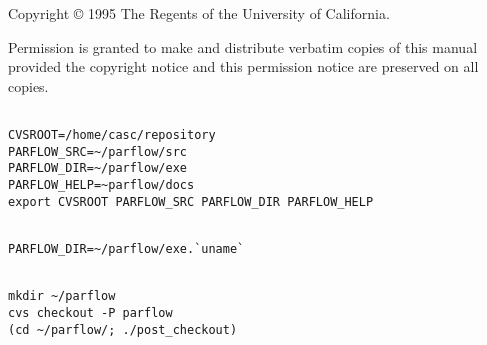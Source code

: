 
{\newpage\clearpage
{}%
\begin{TitlePage}
\par
{}
\SubTitle{\today}
\par
\end{TitlePage}%
\lthtmlfigureZ
\lthtmlcheckvsize\clearpage}

{\newpage\clearpage
{}%
\begin{CopyrightPage}
\par
\noindent
Copyright \copyright{} 1995 The Regents of the University of California.
\par
\vspace{1em}\noindent
Permission is granted to make and distribute verbatim copies of this
manual provided the copyright notice and this permission notice are
preserved on all copies.
\par
\end{CopyrightPage}%
\lthtmlfigureZ
\lthtmlcheckvsize\clearpage}

{\newpage\clearpage
{}%
\begin{display}\begin{verbatim}

CVSROOT=/home/casc/repository
PARFLOW_SRC=~/parflow/src
PARFLOW_DIR=~/parflow/exe
PARFLOW_HELP=~parflow/docs
export CVSROOT PARFLOW_SRC PARFLOW_DIR PARFLOW_HELP\end{verbatim}
\end{display}%
\lthtmlfigureZ
\lthtmlcheckvsize\clearpage}

{\newpage\clearpage
{}%
\begin{display}\begin{verbatim}

PARFLOW_DIR=~/parflow/exe.`uname`\end{verbatim}
\end{display}%
\lthtmlfigureZ
\lthtmlcheckvsize\clearpage}

{\newpage\clearpage
{}%
\begin{display}\begin{verbatim}

mkdir ~/parflow
cvs checkout -P parflow
(cd ~/parflow/; ./post_checkout)\end{verbatim}
\end{display}%
\lthtmlfigureZ
\lthtmlcheckvsize\clearpage}

